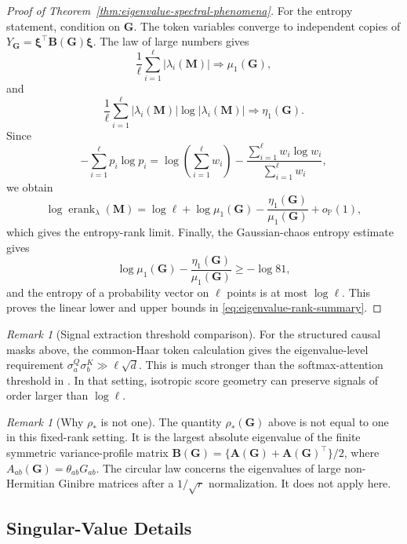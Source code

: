 \documentclass{article}
\newcommand{\Prob}{\mathbb{P}}
\newcommand{\weak}{\Rightarrow}
\newcommand{\bA}{\mathbf{A}}
\newcommand{\bB}{\mathbf{B}}
\newcommand{\bM}{\mathbf{M}}
\newcommand{\bG}{\mathbf{G}}
\theoremstyle{remark}
\newtheorem{remark}[theorem]{Remark}
\begin{document}
\begin{proof}[Proof of Theorem~\ref{thm:eigenvalue-spectral-phenomena}]
For the entropy statement, condition on $\bG$.  The token variables converge to
independent copies of $Y_{\bG}=\boldsymbol{\xi}^\top\bB(\bG)\boldsymbol{\xi}$.
The law of large numbers gives
\[
    \frac{1}{\ell}\sum_{i=1}^{\ell}|\lambda_i(\bM)|
    \weak
    \mu_1(\bG),
\]
and
\[
    \frac{1}{\ell}\sum_{i=1}^{\ell}
    |\lambda_i(\bM)|
    \log |\lambda_i(\bM)|
    \weak
    \eta_1(\bG).
\]
Since
\[
    -\sum_{i=1}^{\ell}p_i\log p_i
    =
    \log\left(\sum_{i=1}^{\ell}w_i\right)
    -
    \frac{\sum_{i=1}^{\ell}w_i\log w_i}
    {\sum_{i=1}^{\ell}w_i},
\]
we obtain
\begin{equation}
    \log\operatorname{erank}_{\lambda}(\bM)
    =
    \log\ell+\log\mu_1(\bG)
    -
    \frac{\eta_1(\bG)}{\mu_1(\bG)}
    +o_{\Prob}(1),
    \label{eq:eigenvalue-entropy-limit}
\end{equation}
which gives the entropy-rank limit.  Finally, the Gaussian-chaos entropy
estimate gives
\[
    \log\mu_1(\bG)
    -
    \frac{\eta_1(\bG)}{\mu_1(\bG)}
    \geq
    -\log81,
\]
and the entropy of a probability vector on $\ell$ points is at most $\log\ell$.
This proves the linear lower and upper bounds in
\eqref{eq:eigenvalue-rank-summary}.
\end{proof}

\begin{remark}[Signal extraction threshold comparison]
For the structured causal masks above, the common-Haar token calculation gives
the eigenvalue-level requirement
$\sigma^Q_a\sigma^K_b \gg \ell\sqrt d$.  This is much stronger than the
softmax-attention threshold in \citet{li:2026spectral}.  In that setting,
isotropic score geometry can preserve signals of order larger than $\log \ell$.
\label{rem:threshold-comparison}
\end{remark}

\begin{remark}[Why $\rho_*$ is not one]
The quantity $\rho_*(\bG)$ above is not equal to one in this fixed-rank setting.
It is the largest absolute eigenvalue of the finite symmetric variance-profile
matrix $\bB(\bG)=\{\bA(\bG)+\bA(\bG)^\top\}/2$, where
$A_{ab}(\bG)=\theta_{ab}G_{ab}$.  The circular law concerns the eigenvalues of
large non-Hermitian Ginibre matrices after a $1/\sqrt r$ normalization.  It does
not apply here.
\label{rem:rho-star-not-one}
\end{remark}

\subsection{Singular-Value Details}
\label{app:singular-details}
\end{document}
